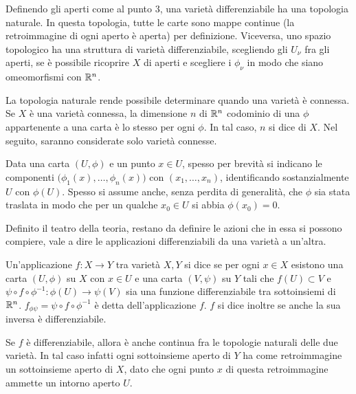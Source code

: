 \begin{remark}
  Definendo gli aperti come al punto $3$, una varietà differenziabile ha una topologia naturale. In questa topologia, tutte le carte sono mappe continue (la retroimmagine di ogni aperto è aperta) per definizione. Viceversa, uno spazio topologico ha una struttura di varietà differenziabile, scegliendo gli $U_{\nu}$ fra gli aperti, se è possibile ricoprire $X$ di aperti e scegliere i $\phi_{\nu}$ in modo che siano omeomorfismi con $\mathbb{R}^{n}$.
\end{remark}
\begin{remark}
  La topologia naturale rende possibile determinare quando una varietà è connessa. Se $X$ è una varietà connessa, la dimensione $n$ di $\mathbb{R}^{n}$ codominio di una $\phi$ appartenente a una carta è lo stesso per ogni $\phi$. In tal caso, $n$ si dice  di $X$. Nel seguito, saranno considerate solo varietà connesse.
\end{remark}

Data una carta $(U,\phi)$ e un punto $x \in U$, spesso per brevità si indicano le componenti $\big(\phi_1(x), \ldots, \phi_{n}(x)\big)$ con $(x_1, \ldots, x_n)$, identificando sostanzialmente $U$ con $\phi(U)$. Spesso si assume anche, senza perdita di generalità, che $\phi$ sia stata traslata in modo che per un qualche $x_0 \in  U$ si abbia $\phi(x_0) = 0$. 

Definito il teatro della teoria, restano da definire le azioni che in essa si possono compiere, vale a dire le applicazioni differenziabili da una varietà a un'altra.
\begin{definition}
  Un'applicazione $f:X \to Y$ tra varietà $X, Y$ si dice  se per ogni $x \in  X$ esistono una carta $(U, \phi)$ su $X$ con $x \in U$ e una carta $(V, \psi)$ su $Y$ tali che $f(U) \subset V$ e $\psi \circ f \circ \phi^{-1}: \phi(U) \to \psi(V)$ sia una funzione differenziabile tra sottoinsiemi di $\mathbb{R}^{n}$. $f_{\phi \psi} = \psi \circ f \circ \phi^{-1}$ è detta  dell'applicazione $f$. $f$ si dice inoltre  se anche la sua inversa è differenziabile. 
\end{definition}
\begin{remark}
  Se $f$ è differenziabile, allora è anche continua fra le topologie naturali delle due varietà. In tal caso infatti ogni sottoinsieme aperto di $Y$ ha come retroimmagine un sottoinsieme aperto di $X$, dato che ogni punto $x$ di questa retroimmagine ammette un intorno aperto $U$.
\end{remark}

